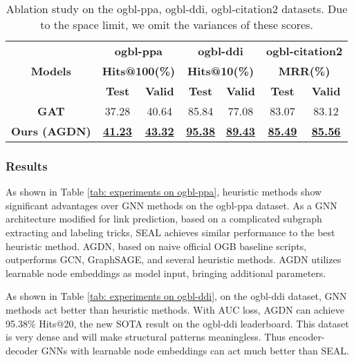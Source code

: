 \documentclass{article}
\begin{document}
\begin{table}[!hbt]
\caption{Ablation study on the ogbl-ppa, ogbl-ddi, ogbl-citation2 datasets. Due to the space limit, we omit the variances of these scores.}
\label{tab: ablation study on ogbl}
    \begin{center}
        \begin{tabular}{c|cccccc}
        \toprule[1pt]
        \multirow{3}{*}{\textbf{Models}} & \multicolumn{2}{c}{\textbf{ogbl-ppa}} & \multicolumn{2}{c}{\textbf{ogbl-ddi}} & \multicolumn{2}{c}{\textbf{ogbl-citation2}} \\

         \cline{2-7}& \multicolumn{2}{c}{\textbf{Hits@100(\%)}} & \multicolumn{2}{c}{\textbf{Hits@10(\%)}} & \multicolumn{2}{c}{\textbf{MRR(\%)}} \\
         & \textbf{Test} & \textbf{Valid} & \textbf{Test} & \textbf{Valid} & \textbf{Test} & \textbf{Valid} \\
         \midrule
         \textbf{GAT} & 37.28 & 40.64 & 85.84 & 77.08 & 83.07 & 83.12 \\
         \textbf{Ours (AGDN)} & \underline{\textbf{41.23}} & \underline{\textbf{43.32}} & \underline{\textbf{95.38}} & \underline{\textbf{89.43}} & \underline{\textbf{85.49}} & \underline{\textbf{85.56}} \\
         \bottomrule[1pt]
        \end{tabular}
    \end{center}
\end{table}

\subsubsection{Results}
As shown in Table \ref{tab: experiments on ogbl-ppa}, heuristic methods show significant advantages over GNN methods on the ogbl-ppa dataset. As a GNN architecture modified for link prediction, based on a complicated subgraph extracting and labeling tricks, SEAL achieves similar performance to the best heuristic method. AGDN, based on naive official OGB baseline scripts, outperforms GCN, GraphSAGE, and several heuristic methods. AGDN utilizes learnable node embeddings as model input, bringing additional parameters.

As shown in Table \ref{tab: experiments on ogbl-ddi}, on the ogbl-ddi dataset, GNN methods act better than heuristic methods. With AUC loss, AGDN can achieve 95.38\% Hits@20, the new SOTA result on the ogbl-ddi leaderboard. This dataset is very dense and will make structural patterns meaningless. Thus encoder-decoder GNNs with learnable node embeddings can act much better than SEAL.
\end{document}
